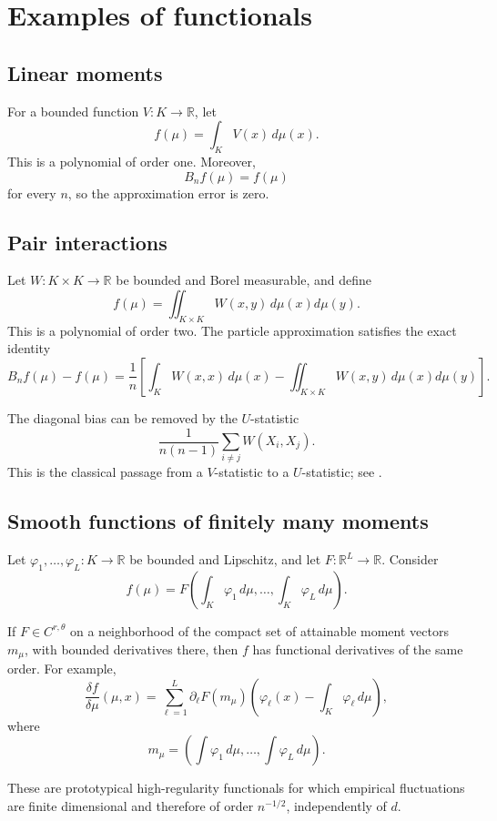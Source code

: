 \documentclass[11pt]{article}
\newcommand{\R}{\mathbb R}
\begin{document}
\section{Examples of functionals}

\subsection{Linear moments}

For a bounded function \(V:K\to\R\), let
\[
f(\mu)=\int_K V(x)\,d\mu(x).
\]
This is a polynomial of order one. Moreover,
\[
B_nf(\mu)=f(\mu)
\]
for every \(n\), so the approximation error is zero.

\subsection{Pair interactions}

Let \(W:K\times K\to\R\) be bounded and Borel measurable, and define
\[
f(\mu)
=
\iint_{K\times K}
W(x,y)\,d\mu(x)d\mu(y).
\]
This is a polynomial of order two. The particle approximation satisfies
the exact identity
\[
B_nf(\mu)-f(\mu)
=
\frac1n
\left[
\int_K W(x,x)\,d\mu(x)
-
\iint_{K\times K}W(x,y)\,d\mu(x)d\mu(y)
\right].
\]

The diagonal bias can be removed by the \(U\)-statistic
\[
\frac1{n(n-1)}
\sum_{i\neq j}W(X_i,X_j).
\]
This is the classical passage from a \(V\)-statistic to a
\(U\)-statistic; see \cite{hoeffding,serfling}.

\subsection{Smooth functions of finitely many moments}

Let \(\varphi_1,\ldots,\varphi_L:K\to\R\) be bounded and Lipschitz, and
let \(F:\R^L\to\R\). Consider
\[
f(\mu)
=
F\left(
\int_K\varphi_1\,d\mu,\ldots,
\int_K\varphi_L\,d\mu
\right).
\]

If \(F\in C^{r,\theta}\) on a neighborhood of the compact set of
attainable moment vectors \(m_\mu\), with bounded derivatives there,
then \(f\) has functional derivatives of the same order. For example,
\[
\frac{\delta f}{\delta\mu}(\mu,x)
=
\sum_{\ell=1}^L
\partial_\ell F(m_\mu)
\left(
\varphi_\ell(x)-\int_K\varphi_\ell\,d\mu
\right),
\]
where
\[
m_\mu
=
\left(
\int\varphi_1\,d\mu,\ldots,\int\varphi_L\,d\mu
\right).
\]

These are prototypical high-regularity functionals for which empirical
fluctuations are finite dimensional and therefore of order \(n^{-1/2}\),
independently of \(d\).
\end{document}
